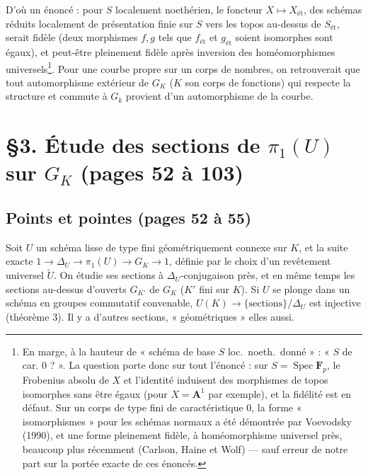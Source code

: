 \documentclass[11pt,a4paper]{article}
\begin{document}
D'où un énoncé : pour $S$ localement noethérien, le foncteur $X \mapsto
X_{\mathrm{ét}}$, des schémas réduits localement de présentation finie sur $S$
vers les topos au-dessus de $S_{\mathrm{ét}}$, serait fidèle (deux morphismes
$f, g$ tels que $f_{\mathrm{ét}}$ et $g_{\mathrm{ét}}$ soient isomorphes sont
égaux), et peut-être pleinement fidèle après inversion des homéomorphismes
universels\footnote{En marge, à la hauteur de « schéma de base $S$ loc.\ noeth.\
donné » : « $S$ de car. $0$ ? ». La question porte donc sur tout l'énoncé :
sur $S = \operatorname{Spec} \mathbf{F}_p$, le Frobenius absolu de $X$ et
l'identité induisent des morphismes de topos isomorphes sans être égaux (pour
$X = \mathbf{A}^1$ par exemple), et la fidélité est en défaut. Sur un corps de type
fini de caractéristique $0$, la forme « isomorphismes » pour les schémas normaux
a été démontrée par Voevodsky (1990), et une forme pleinement fidèle, à
homéomorphisme universel près, beaucoup plus récemment (Carlson, Haine et
Wolf) — sauf erreur de notre part sur la portée exacte de ces énoncés.}. Pour
une courbe propre sur un corps de nombres, on retrouverait que tout
automorphisme extérieur de $G_K$ ($K$ son corps de fonctions) qui respecte la
structure et commute à $G_k$ provient d'un automorphisme de la courbe.

\section*{§3. Étude des sections de $\pi_1(U)$ sur $G_K$ (pages 52 à 103)}

\subsection*{Points et pointes (pages 52 à 55)}

Soit $U$ un schéma lisse de type fini géométriquement connexe sur $K$, et la
suite exacte $1 \to \Delta_U \to \pi_1(U) \to G_K \to 1$, définie par le choix
d'un revêtement universel $\widetilde{U}$. On étudie ses sections à
$\Delta_U$-conjugaison près, et en même temps les sections au-dessus d'ouverts
$G_{K'}$ de $G_K$ ($K'$ fini sur $K$). Si $U$ se plonge dans un schéma en
groupes commutatif convenable, $U(K) \to \{\text{sections}\}/\Delta_U$ est
injective (théorème 3). Il y a d'autres sections, « géométriques » elles
aussi.
\end{document}

